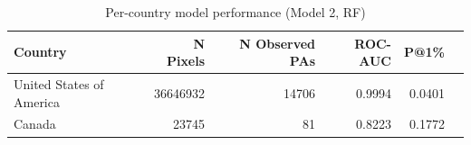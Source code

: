 \begin{table}[h]
\centering
\begin{tabular}{lrrrrr}
\toprule
Country & N Pixels & N Observed PAs & ROC-AUC & P@1\% \\
\midrule
United States of America & 36646932 & 14706 & 0.9994 & 0.0401 \\
Canada & 23745 & 81 & 0.8223 & 0.1772 \\
\bottomrule
\end{tabular}
\caption{Per-country model performance (Model 2, RF)}
\label{tab:country_breakdown_rf}
\end{table}
